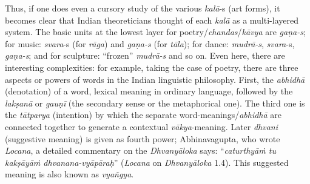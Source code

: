 Thus, if one does even a cursory study of the various \textsl{kalā}-s (art forms), it becomes clear that Indian theoreticians thought of each \textsl{kalā} as a multi-layered system. The basic units at the lowest layer for poetry/\textsl{chandas}/\textsl{kāvya} are \textsl{gaṇa-s}; for music: \textsl{svara}-s (for \textsl{rāga}) and \textsl{gaṇa-s} (for \textsl{tāla}); for dance: \textsl{mudrā-s}, \textsl{svara}-s, \textsl{gaṇa-s}; and for sculpture: “frozen” \textsl{mudrā-s} and so on. Even here, there are interesting complexities: for example, taking the case of poetry, there are three aspects or powers of words in the Indian linguistic philosophy. First, the \textsl{abhidhā} (denotation) of a word, lexical meaning in ordinary language, followed by the \textsl{lakṣanā} or \textsl{gauṇī} (the secondary sense or the metaphorical one). The third one is the \textsl{tātparya} (intention) by which the separate word-meanings/\textsl{abhidhā} are connected together to generate a contextual \textsl{vākya}-meaning. Later \textsl{dhvani} (suggestive meaning) is given as fourth power; Abhinavagupta, who wrote \textsl{Locana}, a detailed commentary on the \textsl{Dhvanyāloka} says: “\textsl{caturthyāṁ tu kakṣāyāṁ dhvanana-vyāpāraḥ}” (\textsl{Locana} on \textsl{Dhvanyāloka} 1.4). This suggested meaning is also known as \textsl{vyañgya}.

